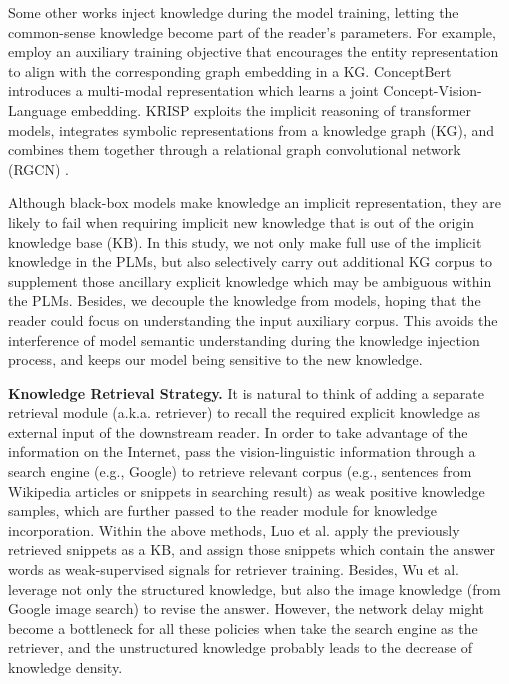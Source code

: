 \documentclass[sigconf]{acmart}
\newcommand{\cjy}[1]{{\color{black}#1}}
\begin{document}
Some other works inject knowledge during the model training, letting the common-sense knowledge become part of the reader's parameters. For example, \citep{DBLP:journals/corr/abs-2101-06013} employ an auxiliary training objective that encourages the entity representation to align with the corresponding graph embedding in a KG.
ConceptBert \citep{DBLP:conf/emnlp/GarderesZAL20} introduces a multi-modal representation which learns a joint Concept-Vision-Language embedding. 
KRISP \citep{DBLP:conf/cvpr/MarinoCP0R21} exploits the implicit reasoning of transformer models, integrates symbolic representations from a knowledge graph (KG), and combines them together through a relational graph convolutional network (RGCN) \citep{DBLP:conf/esws/SchlichtkrullKB18}.

Although black-box models make knowledge an implicit representation, they are likely to fail when requiring implicit new knowledge that is out of the origin knowledge base (KB).
In this study, we not only make full use of the implicit knowledge in the PLMs, but also selectively carry out additional KG corpus to supplement those ancillary explicit knowledge which may be ambiguous within the PLMs. 
Besides, we decouple the knowledge from models, hoping that the reader could focus on understanding the input auxiliary corpus. This avoids the interference of model semantic understanding during the knowledge injection process, and keeps our model being sensitive to the new knowledge.



\noindent\textbf{Knowledge Retrieval Strategy.}
It is natural to think of adding a separate retrieval module (a.k.a. retriever) to recall the required explicit knowledge as external input of the downstream reader.
In order to take advantage of the information on the Internet, \citep{DBLP:conf/cvpr/MarinoRFM19,DBLP:journals/corr/abs-2109-04014,DBLP:conf/sigir/QuZ0CL21,DBLP:conf/sigir/JainKKJRC21} pass the vision-linguistic information through a search engine (e.g., Google) to retrieve relevant corpus (e.g., sentences from  \cjy{Wikipedia} articles or snippets in searching result) as weak positive knowledge samples, which are further passed to the reader module for knowledge incorporation.
Within the above methods, Luo et al. \citep{DBLP:journals/corr/abs-2109-04014} apply the previously retrieved snippets as a KB, and assign those snippets which contain the answer words as  weak-supervised signals for retriever training. 
Besides, Wu et al. \citep{DBLP:journals/corr/abs-2103-12248} leverage not only the structured knowledge, but also the image knowledge (from Google image search) to revise the answer.
However, the network delay might become a bottleneck for all these policies when take the search engine as the retriever, and the unstructured knowledge probably leads to the decrease of knowledge density.
\end{document}

